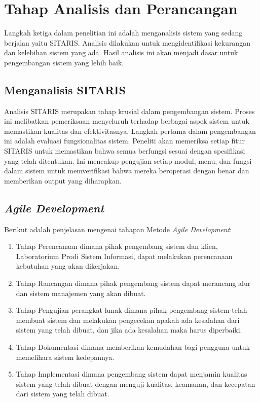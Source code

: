 \section{Tahap Analisis dan Perancangan}
Langkah ketiga dalam penelitian ini adalah menganalisis sistem yang sedang berjalan yaitu SITARIS. Analisis dilakukan untuk mengidentifikasi kekurangan dan kelebihan sistem yang ada. Hasil analisis ini akan menjadi dasar untuk pengembangan sistem yang lebih baik.

\subsection{Menganalisis SITARIS}
Analisis SITARIS merupakan tahap krusial dalam pengembangan sistem. Proses ini melibatkan pemeriksaan menyeluruh terhadap berbagai aspek sistem untuk memastikan kualitas dan efektivitasnya. Langkah pertama dalam pengembangan ini adalah evaluasi fungsionalitas sistem. Peneliti akan memeriksa setiap fitur SITARIS untuk memastikan bahwa semua berfungsi sesuai dengan spesifikasi yang telah ditentukan. Ini mencakup pengujian setiap modul, menu, dan fungsi dalam sistem untuk memverifikasi bahwa mereka beroperasi dengan benar dan memberikan output yang diharapkan.

\subsection{\textit{Agile Development}}
Berikut adalah penjelasan mengenai tahapan Metode \textit{Agile Development}:
\begin{enumerate}
	\item Tahap Perencanaan dimana pihak pengembang sistem dan klien, Laboratorium Prodi Sistem Informasi, dapat melakukan perencanaan kebutuhan yang akan dikerjakan.
	\item Tahap Rancangan dimana pihak pengembang sistem dapat merancang alur dan sistem manajemen yang akan dibuat.
	\item Tahap Pengujian perangkat lunak dimana pihak pengembang sistem telah membuat sistem dan melakukan pengecekan apakah ada kesalahan dari sistem yang telah dibuat, dan jika ada kesalahan maka harus diperbaiki.
	\item Tahap Dokumentasi dimana memberikan kemudahan bagi pengguna untuk memelihara sistem kedepannya.
	\item Tahap Implementasi dimana pengembang sistem dapat menjamin kualitas sistem yang telah dibuat dengan menguji kualitas, keamanan, dan kecepatan dari sistem yang telah dibuat.
\end{enumerate}

